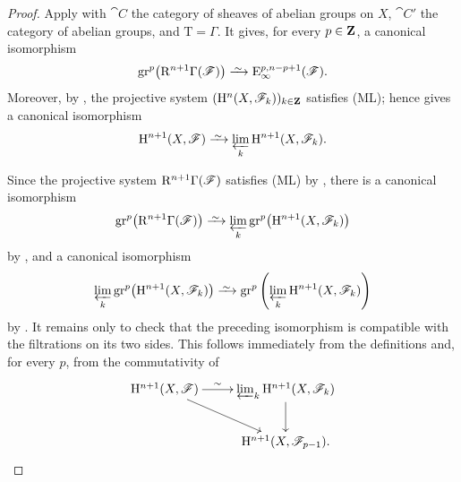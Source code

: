 \begin{proof}
Apply  with $\cat{C}$ the category of sheaves of
abelian groups on $X$, $\cat{C}'$ the category of abelian groups,
and $\mathrm{T}=\Gamma$.
It gives, for every $p\in\mathbf{Z}$, a canonical isomorphism
\[
  \mathrm{gr}^p\bigl(\RR^{n+1}\Gamma(\sh{F})\bigr)
  \isoto
  \mathrm{E}_\infty^{p,n-p+1}(\sh{F}).
\]
Moreover, by , the projective system
$(\mathrm{H}^n(X,\mathscr{F}_k))_{k\in\mathbf{Z}}$ satisfies {\rm(ML)}; hence
 gives a canonical isomorphism
\[
  \HH^{n+1}(X,\sh{F})
  \isoto
  \varprojlim_k\HH^{n+1}(X,\sh{F}_k).
\]

Since the projective system
$\mathrm{R}^{n+1}\Gamma(\mathscr{F})$ satisfies {\rm(ML)} by
, there is a canonical isomorphism
\[
  \mathrm{gr}^p\bigl(\RR^{n+1}\Gamma(\sh{F})\bigr)
  \isoto
  \varprojlim_k
  \mathrm{gr}^p\bigl(\HH^{n+1}(X,\sh{F}_k)\bigr)
\]
by , and a canonical isomorphism
\[
  \varprojlim_k
  \mathrm{gr}^p\bigl(\HH^{n+1}(X,\sh{F}_k)\bigr)
  \isoto
  \mathrm{gr}^p\left(
    \varprojlim_k\HH^{n+1}(X,\sh{F}_k)
  \right)
\]
by .
It remains only to check that the preceding isomorphism is
compatible with the filtrations on its two sides.
This follows immediately from the definitions and, for every $p$,
from the commutativity of
\[
  \xymatrix{
    \HH^{n+1}(X,\sh{F})
      \ar[r]^-{\sim}\ar[dr]
    &
    \varprojlim_k\HH^{n+1}(X,\sh{F}_k)
      \ar[d]
    \\
    &
    \HH^{n+1}(X,\sh{F}_{p-1}).
  }
\]
\end{proof}


